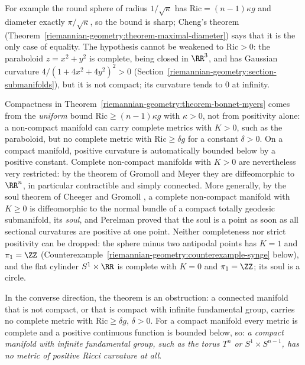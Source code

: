 For example the round sphere of radius $1/\sqrt\kappa$ has $\mathrm{Ric} = (n - 1)\kappa g$ and diameter exactly $\pi/\sqrt\kappa$, so the bound is sharp; Cheng's theorem
(Theorem~\ref{riemannian-geometry:theorem-maximal-diameter}) says that it is the only case of equality. The hypothesis cannot be weakened to $\mathrm{Ric} > 0$: the paraboloid
$z = x^2 + y^2$ is complete, being closed in $\RR^3$, and has Gaussian curvature $4/(1 + 4x^2 + 4y^2)^2 > 0$
(Section~\ref{riemannian-geometry:section-submanifolds}), but it is not compact; its curvature tends to $0$ at infinity.

\begin{remark}\label{riemannian-geometry:remark-noncompact-positive}
Compactness in Theorem~\ref{riemannian-geometry:theorem-bonnet-myers} comes from the \emph{uniform} bound $\mathrm{Ric} \geq (n - 1)\kappa g$ with $\kappa > 0$, not from
positivity alone: a non-compact manifold can carry complete metrics with $K > 0$, such as the paraboloid, but no complete metric with $\mathrm{Ric} \geq \delta g$ for a
constant $\delta > 0$. On a compact manifold, positive curvature is automatically bounded below by a positive constant. Complete non-compact manifolds with $K > 0$ are
nevertheless very restricted: by the theorem of Gromoll and Meyer \cite{gromoll-meyer-1969} they are diffeomorphic to $\RR^n$, in particular contractible and simply
connected. More generally, by the soul theorem of Cheeger and Gromoll \cite{cheeger-gromoll-1972}, a complete non-compact manifold with $K \geq 0$ is diffeomorphic to the
normal bundle of a compact totally geodesic submanifold, its \emph{soul}, and Perelman \cite{perelman-1994} proved that the soul is a point as soon as all sectional
curvatures are positive at one point. Neither completeness nor strict positivity can be dropped: the sphere minus two antipodal points has $K = 1$ and $\pi_1 = \ZZ$
(Counterexample~\ref{riemannian-geometry:counterexample-synge} below), and the flat cylinder $S^1 \times \RR$ is complete with $K = 0$ and $\pi_1 = \ZZ$; its soul is a circle.

In the converse direction, the theorem is an obstruction: a connected manifold that is not compact, or that is compact with infinite fundamental group, carries no complete metric with
$\mathrm{Ric} \geq \delta g$, $\delta > 0$. For a compact manifold every metric is complete and a positive continuous function is bounded below, so: \emph{a compact manifold with infinite fundamental
group, such as the torus $T^n$ or $S^1 \times S^{n-1}$, has no metric of positive Ricci curvature at all}.
\end{remark}


